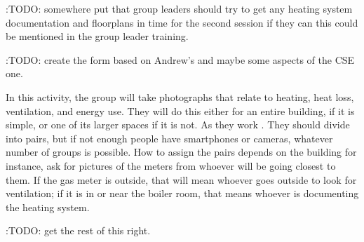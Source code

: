 \documentclass[letterpaper,10pt,english]{jupyterBook}
\begin{document}
\sphinxAtStartPar
:TODO: somewhere put that group leaders should try to get any heating system documentation and floorplans in time for the second session if they can \sphinxhyphen{} this could be mentioned in the group leader training.

\sphinxAtStartPar
:TODO: create the form based on Andrew’s and maybe some aspects of the CSE one.

\sphinxAtStartPar
In this activity, the group will take photographs that relate to heating, heat loss, ventilation, and energy use.  They will do this either for an entire building, if it is simple, or one of its larger spaces if it is not.  As they work .  They should divide into pairs, but if not enough people have smartphones or cameras, whatever number of groups is possible. How to assign the pairs depends on the building \sphinxhyphen{} for instance, ask for pictures of the meters from whoever will be going closest to them.  If the gas meter is outside, that will mean whoever goes outside to look for ventilation; if it is in or near the boiler room, that means whoever is documenting the heating system.

\sphinxAtStartPar
:TODO: get the rest of this right.
\end{document}
